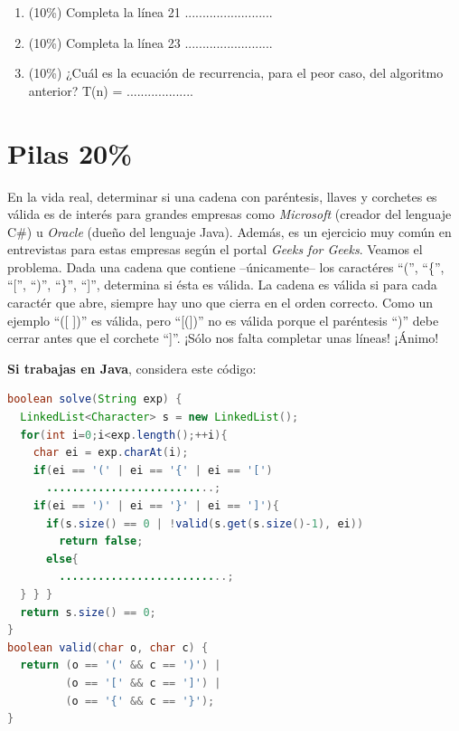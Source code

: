 \documentclass[10 pt]{article}
\begin{document}
\begin{enumerate}[label=(\Alph*)]
\item (10\%) Completa la línea 21 .........................
\item (10\%) Completa la línea 23 .........................
\item (10\%) ¿Cuál es la ecuación de recurrencia, para el peor caso, del algoritmo anterior? T(n) = ...................
\end{enumerate}

\newpage


\section{Pilas 20\%}



En la vida real, determinar si una cadena con paréntesis, llaves y corchetes es válida es de interés para grandes empresas como \emph{Microsoft} (creador del lenguaje C\#) u \emph{Oracle } (dueño del lenguaje Java). Además, es un ejercicio muy común en entrevistas para estas empresas según el portal \emph{Geeks for Geeks}. Veamos el problema. 
Dada una cadena que contiene --únicamente-- los caractéres ``('', ``\{'', ``['', ``)'', ``\}'', ``]'', determina si ésta es válida. La cadena es válida si para cada caractér que abre, siempre hay uno que cierra en el orden correcto. Como un ejemplo ``([ ])'' es válida, pero ``[({}])'' no es válida porque el paréntesis ``)'' debe cerrar antes que el corchete ``]''. ¡Sólo nos falta completar unas líneas! ¡Ánimo!

\hspace{1cm}

\textbf{Si trabajas en Java}, considera este código:

\begin{lstlisting}[language=Java]
boolean solve(String exp) {
  LinkedList<Character> s = new LinkedList();
  for(int i=0;i<exp.length();++i){
    char ei = exp.charAt(i);
    if(ei == '(' | ei == '{' | ei == '[')
      ..........................;
    if(ei == ')' | ei == '}' | ei == ']'){
      if(s.size() == 0 | !valid(s.get(s.size()-1), ei))
        return false;
      else{
        ..........................;
  } } }
  return s.size() == 0;
}
boolean valid(char o, char c) {
  return (o == '(' && c == ')') |
         (o == '[' && c == ']') |
         (o == '{' && c == '}');
}
\end{lstlisting}
\end{document}
